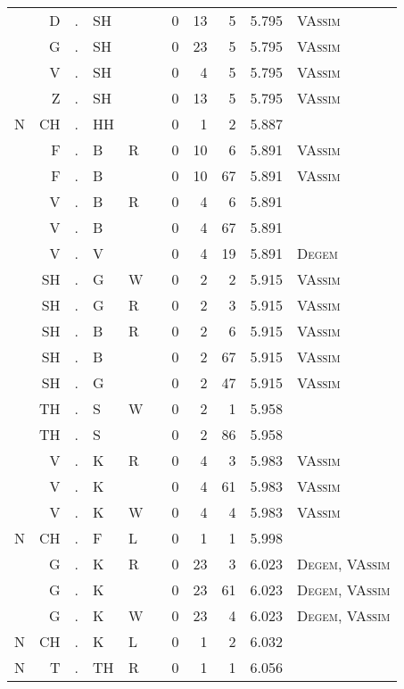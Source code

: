 \begin{longtable}{r@{ } r@{ } c@{ } l@{ } l@{ } l@{ } r r r r l }
  & D & . & SH &   &   & 0 & 13 & 5 & 5.795 & \textsc{VAssim} \\
  & G & . & SH &   &   & 0 & 23 & 5 & 5.795 & \textsc{VAssim} \\
  & V & . & SH &   &   & 0 & 4 & 5 & 5.795 & \textsc{VAssim} \\
  & Z & . & SH &   &   & 0 & 13 & 5 & 5.795 & \textsc{VAssim} \\
N & CH & . & HH &   &   & 0 & 1 & 2 & 5.887 &  \\
  & F & . & B & R &   & 0 & 10 & 6 & 5.891 & \textsc{VAssim} \\
  & F & . & B &   &   & 0 & 10 & 67 & 5.891 & \textsc{VAssim} \\
  & V & . & B & R &   & 0 & 4 & 6 & 5.891 &  \\
  & V & . & B &   &   & 0 & 4 & 67 & 5.891 &  \\
  & V & . & V &   &   & 0 & 4 & 19 & 5.891 & \textsc{Degem} \\
  & SH & . & G & W &   & 0 & 2 & 2 & 5.915 & \textsc{VAssim} \\
  & SH & . & G & R &   & 0 & 2 & 3 & 5.915 & \textsc{VAssim} \\
  & SH & . & B & R &   & 0 & 2 & 6 & 5.915 & \textsc{VAssim} \\
  & SH & . & B &   &   & 0 & 2 & 67 & 5.915 & \textsc{VAssim} \\
  & SH & . & G &   &   & 0 & 2 & 47 & 5.915 & \textsc{VAssim} \\
  & TH & . & S & W &   & 0 & 2 & 1 & 5.958 &  \\
  & TH & . & S &   &   & 0 & 2 & 86 & 5.958 &  \\
  & V & . & K & R &   & 0 & 4 & 3 & 5.983 & \textsc{VAssim} \\
  & V & . & K &   &   & 0 & 4 & 61 & 5.983 & \textsc{VAssim} \\
  & V & . & K & W &   & 0 & 4 & 4 & 5.983 & \textsc{VAssim} \\
N & CH & . & F & L &   & 0 & 1 & 1 & 5.998 &  \\
  & G & . & K & R &   & 0 & 23 & 3 & 6.023 & \textsc{Degem}, \textsc{VAssim} \\
  & G & . & K &   &   & 0 & 23 & 61 & 6.023 & \textsc{Degem}, \textsc{VAssim} \\
  & G & . & K & W &   & 0 & 23 & 4 & 6.023 & \textsc{Degem}, \textsc{VAssim} \\
N & CH & . & K & L &   & 0 & 1 & 2 & 6.032 &  \\
N & T & . & TH & R &   & 0 & 1 & 1 & 6.056 &  \\

\end{longtable}
